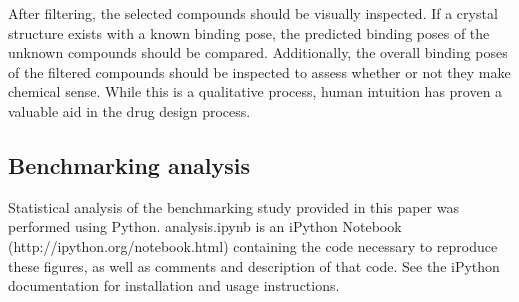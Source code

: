 After filtering, the selected compounds should be visually inspected. 
If a crystal structure exists with a known binding pose, the predicted binding poses of the unknown compounds should be compared. 
Additionally, the overall binding poses of the filtered compounds should be inspected to assess whether or not they make chemical sense. 
While this is a qualitative process, human intuition has proven a valuable aid in the drug design process\citep{Voet:2014de}.

\subsection{Benchmarking analysis}

Statistical analysis of the benchmarking study provided in this paper was performed using Python. 
analysis.ipynb is an iPython Notebook (http://ipython.org/notebook.html) containing the code necessary to reproduce these figures, as well as comments and description of that code.
See the iPython documentation for installation and usage instructions.

